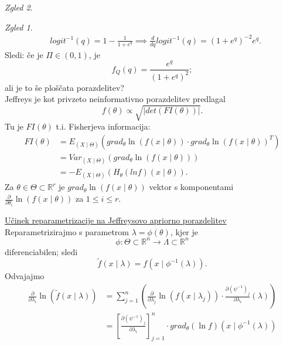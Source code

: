 \documentclass[a4paper, 12pt]{book}
\theoremstyle{definition}
\theoremstyle{remark}
\newtheorem*{exmp}{Zgled}
\newcommand{\R}{\mathbb{R}}
\begin{document}
\begin{exmp}
\begin{exmp}
\begin{align*}
      &logit^{-1}(q) = 1 - \frac{1}{1+e^q} \implies \frac{d}{dq} logit^{-1}(q) = (1+e^q)^{-2} e^q.
    \end{align*}
    Sledi: če je $\Pi \in (0,1)$, je
    \begin{equation*}
      f_Q(q) = \frac{e^q}{(1+e^q)^2};
    \end{equation*}
    ali je to še ploščata porazdelitev? \\
    Jeffreys je kot privzeto neinformativno porazdelitev predlagal
    \begin{equation}
      \label{Jeffrey-neinformativna}
      f(\theta) \propto \sqrt{|det (FI(\theta))|}.
    \end{equation}
    Tu je $FI(\theta)$ t.i. Fisherjeva informacija:
    \begin{align*}
      FI(\theta) &= E_{(X \mid \Theta)} (grad_{\theta} \ln(f(x \mid \theta)) \cdot grad_{\theta} \ln(f(x \mid \theta))^T) \\
      &= Var_{(X \mid \Theta)} (grad_{\theta} \ln (f(x \mid \theta))) \\
      &= -E_{(X \mid \Theta)} (H_{\theta} (ln f) (x \mid \theta)).
    \end{align*}
    Za $\theta \in \Theta \subset \R^r$ je $grad_{\theta} \ln (f(x \mid \theta))$ vektor s komponentami
    $\frac{\partial}{\partial \theta_i} \ln(f(x \mid \theta))$ za $1 \leq i \leq r$.
  \end{exmp}
  \underline{Učinek reparametrizacije na Jeffreysovo apriorno porazdelitev} \\
  Reparametrizirajmo s parametrom $\lambda = \phi(\theta)$, kjer je
  \begin{equation*}
    \phi: \Theta \subset \R^n \to \Lambda \subset \R^n
  \end{equation*}
  diferenciabilen; sledi
  \begin{equation*}
    \widetilde{f}(x \mid \lambda) = f(x \mid \phi^{-1}(\lambda)).
  \end{equation*}
  Odvajajmo
  \begin{align*}
    \frac{\partial}{\partial \lambda_i} \ln(\widetilde{f}(x \mid \lambda)) &=
      \sum_{j=1}^{n} (\frac{\partial}{\partial \lambda_j} \ln(f(x \mid \lambda_j)) \cdot
        \frac{\partial (\psi^{-1})_j}{\partial \lambda_i} (\lambda)) \\
    &= \left[\frac{\partial (\psi^{-1})_j}{\partial \lambda_i}\right]_{j=1}^n
      \cdot grad_{\theta} (\ln f) (x \mid \phi^{-1}(\lambda))
  \end{align*}
  \begin{equation*}

\end{equation*}
\end{exmp}
\end{document}
